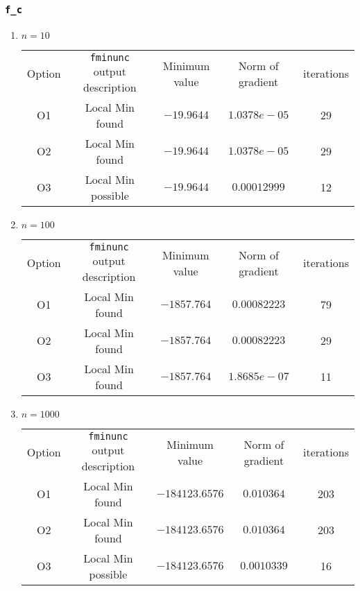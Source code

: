 \documentclass{article}
\begin{document}
    \subsubsection{\texttt{f\_c}}
    \begin{enumerate}
        \item $n=10$
        \begin{center}
        \begin{tabular}{c|c|c|c|c}
        \hline
        Option&\texttt{fminunc} output description&Minimum value&Norm of gradient&iterations\\
        O1&Local Min found&$-19.9644$&$1.0378e-05$&29\\
        O2&Local Min found&$-19.9644$&$1.0378e-05$&29\\
        O3&Local Min possible&$-19.9644$&$0.00012999$&12\\
        \hline
        \end{tabular}
        \end{center}

        \item $n=100$
        \begin{center}
        \begin{tabular}{c|c|c|c|c}
        \hline
        Option&\texttt{fminunc} output description&Minimum value&Norm of gradient&iterations\\
        O1&Local Min found&$-1857.764$&$0.00082223$&79\\
        O2&Local Min found&$-1857.764$&$0.00082223$&29\\
        O3&Local Min found&$-1857.764$&$1.8685e-07$&11\\
        \hline
        \end{tabular}
        \end{center}

        \item $n=1000$
        \begin{center}
        \begin{tabular}{c|c|c|c|c}
        \hline
        Option&\texttt{fminunc} output description&Minimum value&Norm of gradient&iterations\\
        O1&Local Min found&$-184123.6576$&$0.010364$&203\\
        O2&Local Min found&$-184123.6576$&$0.010364$&203\\
        O3&Local Min possible&$-184123.6576$&$0.0010339$&16\\
        \hline
        \end{tabular}
        \end{center}     
    \end{enumerate}
\end{document}
